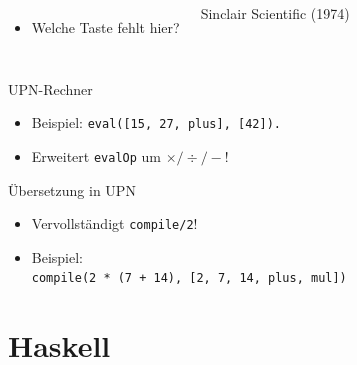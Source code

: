\documentclass{beamer}
\begin{document}
{\begin{frame}[plain]
\begin{columns}
\begin{itemize}
    \item Welche Taste fehlt hier?
  \end{itemize}
  \vspace{1cm}
  {\small Sinclair Scientific (1974)}
\end{columns}
\end{frame}
}

\begin{frame}{UPN-Rechner}

  \begin{itemize}
    \item Beispiel: \texttt{eval([15, 27, plus], [42]).}
    \item Erweitert \texttt{evalOp} um $\times / \div / -$!
  \end{itemize}
\end{frame}

\begin{frame}{Übersetzung in UPN}

  \begin{itemize}
    \item Vervollständigt \texttt{compile/2}!
    \item Beispiel:\\
          \texttt{compile(2 * (7 + 14), [2, 7, 14, plus, mul])}
  \end{itemize}
\end{frame}

\section{Haskell}
\end{document}
